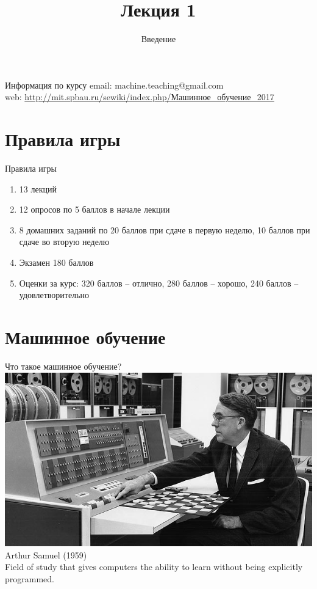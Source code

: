 \documentclass[10pt]{beamer}
\title{Лекция 1}
\subtitle{Введение}
\begin{document}
\maketitle

\begin{frame}{Информация по курсу}
  email: machine.teaching@gmail.com \\
  web: \href{http://mit.spbau.ru/sewiki/index.php/Машинное_обучение_2017}{http://mit.spbau.ru/sewiki/index.php/Машинное\_обучение\_2017}\\
\end{frame}

\section{Правила игры}

\begin{frame}{Правила игры}
  \begin{enumerate} [-]  
    \item 13 лекций
    \item 12 опросов по 5 баллов в начале лекции
    \item 8 домашних заданий по 20 баллов при сдаче в первую неделю, 10 баллов при сдаче во вторую неделю
    \item Экзамен 180 баллов
    \bigbreak
    \item Оценки за курс: \alert{320 баллов} -- отлично, \alert{280 баллов} -- хорошо, \alert{240 баллов} -- удовлетворительно
  \end{enumerate}  
\end{frame}

\section{Машинное обучение}

\begin{frame}{Что такое машинное обучение?}
  \includegraphics[width=0.5 \linewidth, height=0.5 \textheight, keepaspectratio]{images/samuel}\\
	Arthur Samuel (1959) \\
	\bigbreak
	Field of study that gives computers the ability to learn without being explicitly programmed.
\end{frame}
\end{document}
